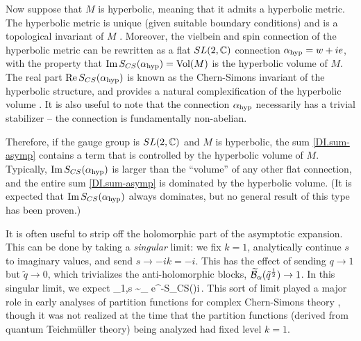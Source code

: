\documentclass[12pt]{article}
\begin{document}
Now suppose that $M$ is hyperbolic, meaning that it admits a hyperbolic metric. The hyperbolic metric is unique (given suitable boundary conditions) and is a topological invariant of $M$ \cite{DImostow-1973, DIthurston-1980}. Moreover, the vielbein and spin connection of the hyperbolic metric can be rewritten as a flat $SL(2,{\mathbb C})$ connection $\alpha_{\rm hyp} = w+ie$, with the property that $\text{Im}\,S_{CS}(\alpha_{\rm hyp}) = \text{Vol}(M)$ is the hyperbolic volume of $M$. The real part $\text{Re}\,S_{CS}(\alpha_{\rm hyp})$ is known as the Chern-Simons invariant of the hyperbolic structure, and provides a natural complexification of the hyperbolic volume \cite{DICheegerSimons, DIChernSimons}. It is also useful to note that the connection $\alpha_{\rm hyp}$ necessarily has a trivial stabilizer -- the connection is fundamentally non-abelian.

Therefore, if the gauge group is $SL(2,{\mathbb C})$ and $M$ is hyperbolic, the sum \eqref{DI.sum-asymp} contains a term that is controlled by the hyperbolic volume of $M$. Typically, $\text{Im}\,S_{CS}(\alpha_{\rm hyp})$ is larger than the ``volume'' of any other flat connection, and the entire sum \eqref{DI.sum-asymp} is dominated by the hyperbolic volume. (It is expected that $\text{Im}\,S_{CS}(\alpha_{\rm hyp})$ always dominates, but no general result of this type has been proven.)


It is often useful to strip off the holomorphic part of the asymptotic expansion. This can be done by taking a \emph{singular} limit: we fix $k=1$, analytically continue $s$ to imaginary values, and send $s\to - ik=-i$. This has the effect of sending $q\to 1$ but $\tilde q\to 0$, which trivializes the anti-holomorphic blocks, $\widetilde {\mathcal{B}}_\alpha(\tilde q^{\frac12})\to 1$. In this singular limit, we expect
%
\DIbe \CalZ[M]_{1,s} \sim \sum_{}   e^{-S_{CS}(\alpha)}\qquad{}\quad {}\pi i\,. \label{DI.sing1} \DIee
%
This sort of limit played a major role in early analyses of partition functions for complex Chern-Simons theory \cite{DIhikami-2006, DIDGLZ}, though it was not realized at the time that the partition functions (derived from quantum Teichm\"uller theory) being analyzed had fixed level $k=1$.
\end{document}
